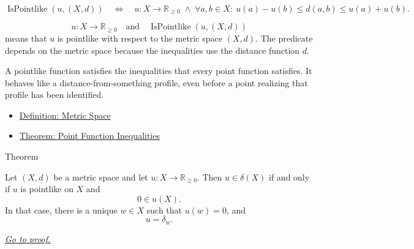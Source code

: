 
\begin{remark*}
\[
\operatorname{IsPointlike}(u,(X,d))
\quad\Longleftrightarrow\quad
u\colon X\to\mathbb{R}_{\geq 0}
\;\land\;
\forall a,b\in X{:}\ u(a)-u(b)\leq d(a,b)\leq u(a)+u(b).
\]
\end{remark*}

\begin{remark*}
\[
u\colon X\to\mathbb{R}_{\geq 0}
\quad\text{and}\quad
\operatorname{IsPointlike}(u,(X,d))
\]
means that \(u\) is pointlike with respect to the metric space \((X,d)\).
The predicate depends on the metric space because the inequalities use the
distance function \(d\).
\end{remark*}

\begin{remark*}[Interpretation]
A pointlike function satisfies the inequalities that every point function
satisfies.  It behaves like a distance-from-something profile, even before a
point realizing that profile has been identified.
\end{remark*}

\begin{dependencies}
\begin{itemize}
  \item \hyperref[def:metric-space]{Definition: Metric Space}
  \item \hyperref[thm:metric-point-function-inequalities]{Theorem: Point Function Inequalities}
\end{itemize}
\end{dependencies}

\begin{theorembox}{Theorem}
\begin{theorem}
\label{thm:metric-pointlike-zero-point-function}
Let \((X,d)\) be a metric space and let \(u:X\to\mathbb{R}_{\geq 0}\).  Then
\(u\in\delta(X)\) if and only if \(u\) is pointlike on \(X\) and
\[
  0\in u(X).
\]
In that case, there is a unique \(w\in X\) such that \(u(w)=0\), and
\[
  u=\delta_w.
\]

\smallskip
\noindent
\hyperref[prf:metric-pointlike-zero-point-function]{\textit{Go to proof.}}
\end{theorem}
\end{theorembox}

